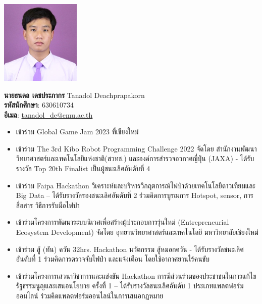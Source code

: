 \documentclass[semifinal]{cpecmu}
\author{นายธนดล เดชประภากร}{Tanadol Deachprapakorn}{630610734}
\author{นายภูริช สีนวลแล}{Purich Seenaullae}{630610752}
\begin{document}


\pagestyle{empty}\cleardoublepage
\normalspacing \setcounter{page}{1}  \pagestyle{cpecmu}





\ifproject

\fi



\ifproject
\normalspacing
\appendix


\ifglossary\glossarypage\fi

\ifindex\indexpage\fi

\begin{biosketch}
  \begin{center}
    \includegraphics[width=1.5in]{./img/phu.png}
  \end{center}
  \textbf{นายธนดล เดชประภากร} Tanadol Deachprapakorn \\
  \textbf{รหัสนักศึกษา}: 630610734 \\
  \textbf{อีเมล}: \href{mailto:tanadol_de@cmu.ac.th}{tanadol\_de@cmu.ac.th}
  \begin{itemize}
    \item เข้าร่วม Global Game Jam 2023 ที่เชียงใหม่
    \item เข้าร่วม The 3rd Kibo Robot Programming Challenge 2022 จัดโดย สำนักงานพัฒนาวิทยาศาสตร์และเทคโนโลยีแห่งชาติ(สวทช.) และองค์การสำรวจอวกาศญี่ปุ่น (JAXA) - ได้รับรางวัล Top 20th Finalist เป็นผู้ชนะเลิศอันดับที่ 4
    \item	เข้าร่วม Faipa Hackathon วิเคราะห์และบริหารวิกฤตการณ์ไฟป่าด้วยเทคโนโลยีดาวเทียมและ Big Data – ได้รับรางวัลรองชนะเลิศอันดับที่ 2 ร่วมคิดการบูรณการ Hotspot, sensor, การสื่อสาร วิธีการรับมือไฟป่า
    \item	เข้าร่วมโครงการพัฒนาระบบนิเวศเพื่อสร้างผู้ประกอบการรุ่นใหม่ (Entrepreneurial Ecosystem Development) จัดโดย อุทยานวิทยาศาสตร์และเทคโนโลยี มหาวิทยาลัยเชียงใหม่
    \item เข้าร่วม สู้ (ทัน) ควัน 32hrs. Hackathon นวัตกรรม สู้หมอกควัน - ได้รับรางวัลชนะเลิศอันดับที่ 1 ร่วมคิดการตรวจจับไฟป่า และแจ้งเตือน โดยใช้อากาศยานไร้คนขับ
    \item เข้าร่วมโครงการเสวนาวิชาการและแข่งขัน Hackathon การมีส่วนร่วมของประชาชนในการแก้ไขรัฐธรรมนูญและเสนอนโยบาย ครั้งที่ 1 – ได้รับรางวัลชนะเลิศอันดับ 1 ประเภทแพลตฟอร์มออนไลน์ ร่วมคิดแพลตฟอร์มออนไลน์ในการเสนอกฎหมาย
  \end{itemize}
\end{biosketch}
\end{document}
